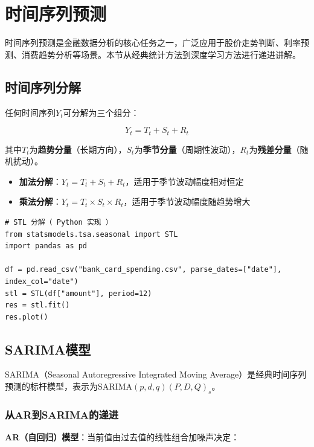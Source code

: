 \section{时间序列预测}

时间序列预测是金融数据分析的核心任务之一，广泛应用于股价走势判断、利率预测、消费趋势分析等场景。本节从经典统计方法到深度学习方法进行递进讲解。

\subsection{时间序列分解}

任何时间序列$Y_t$可分解为三个组分：

\[
Y_t = T_t + S_t + R_t
\]

其中$T_t$为\textbf{趋势分量}（长期方向），$S_t$为\textbf{季节分量}（周期性波动），$R_t$为\textbf{残差分量}（随机扰动）。

\begin{itemize}[leftmargin=2em]
  \item \textbf{加法分解}：$Y_t = T_t + S_t + R_t$，适用于季节波动幅度相对恒定
  \item \textbf{乘法分解}：$Y_t = T_t \times S_t \times R_t$，适用于季节波动幅度随趋势增大
\end{itemize}

\begin{lstlisting}[style=python]
# STL 分解（ Python 实现 ）
from statsmodels.tsa.seasonal import STL
import pandas as pd

df = pd.read_csv("bank_card_spending.csv", parse_dates=["date"], index_col="date")
stl = STL(df["amount"], period=12)
res = stl.fit()
res.plot()
\end{lstlisting}

\subsection{SARIMA模型}

SARIMA（Seasonal Autoregressive Integrated Moving Average）是经典时间序列预测的标杆模型，表示为SARIMA$(p,d,q)(P,D,Q)_s$。

\subsubsection{从AR到SARIMA的递进}

\textbf{AR（自回归）模型}：当前值由过去值的线性组合加噪声决定：

